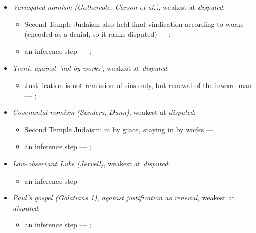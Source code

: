 \documentclass[11pt]{article}
\begin{document}
\begin{itemize}
\begin{itemize}
\item Justification and sanctification are inseparable but distinct --- \cite[XIII.1]{westminster-confession-1647}; \cite[XI.1]{westminster-confession-1647}; \cite[III.xi.6]{calvin-institutes-1960}
\item an inference step --- \cite[Trent, Session VI (1547), canon 9]{tanner-decrees-1990}
\end{itemize}
\item \emph{Variegated nomism (Gathercole, Carson et al.)}, weakest at \emph{disputed}:
\begin{itemize}
\item Second Temple Judaism also held final vindication according to works (encoded as a denial, so it ranks disputed) --- \cite{gathercole-where-boasting-2002}; \cite{carson-variegated-nomism-1-2001}
\item an inference step --- \cite{gathercole-where-boasting-2002}; \cite{carson-variegated-nomism-1-2001}
\end{itemize}
\item \emph{Trent, against 'not by works'}, weakest at \emph{disputed}:
\begin{itemize}
\item Justification is not remission of sins only, but renewal of the inward man --- \cite[Trent, Session VI (1547), Decree on Justification, ch. 7]{tanner-decrees-1990}; \cite[Trent, Session VI (1547), canon 11]{tanner-decrees-1990}
\end{itemize}
\item \emph{Covenantal nomism (Sanders, Dunn)}, weakest at \emph{disputed}:
\begin{itemize}
\item Second Temple Judaism: in by grace, staying in by works --- \cite{sanders-paul-palestinian-judaism-1977}
\item an inference step --- \cite{dunn-new-perspective-2005}; \cite{wright-what-paul-said-1997}
\end{itemize}
\item \emph{Law-observant Luke (Jervell)}, weakest at \emph{disputed}:
\begin{itemize}
\item an inference step --- \cite{jervell-luke-people-god-1972}
\end{itemize}
\item \emph{Paul's gospel (Galatians 1), against justification as renewal}, weakest at \emph{disputed}:
\begin{itemize}
\item an inference step --- \cite[ad loc. Gal 1:6]{moo-galatians-2013}; \cite[XI.1]{westminster-confession-1647}

\end{itemize}
\end{itemize}
\end{document}
